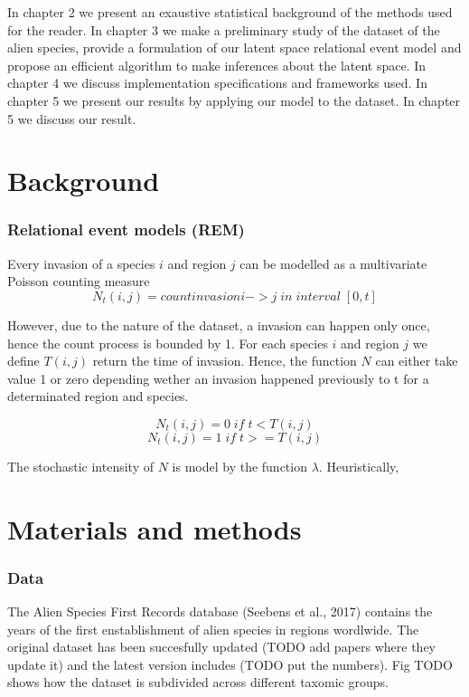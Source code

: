 \documentclass[mscthesis]{usiinfthesis}
\begin{document}
In chapter 2 we present an exaustive statistical background of the methods used for the reader. In chapter 3 we make a preliminary study of the  dataset of the alien species, provide a formulation of our latent space relational event model and propose an efficient algorithm to make inferences about the latent space. In chapter 4 we discuss implementation specifications and frameworks used. In chapter 5 we present our results by applying our model to the dataset. In chapter 5 we discuss our result.

\chapter{Background}
\subsection{Relational event models (REM)}


Every invasion of a species $i$ and region $j$ can be modelled as a multivariate Poisson counting measure $$N_t(i, j) = count{invasion i -> j \; in \; interval \; [0, t]}$$

However, due to the nature of the dataset, a invasion can happen only once, hence the count process is bounded by 1. For each species $i$ and region $j$ we define $T(i, j)$ return the time of invasion. Hence, the function $N$ can either take value 1 or zero depending wether an invasion happened previously to t for a determinated region and species.

\[
N_t(i, j) = 0 \; if \; t < T(i, j)
\]
\[
N_t(i, j) = 1 \; if \; t >= T(i, j)
\]

The stochastic intensity of $N$ is model by the function $\lambda$. Heuristically, 

\chapter{Materials and methods}

\subsection{Data}

The Alien Species First Records database (Seebens et al., 2017) contains the years of the first enstablishment of alien species in regions wordlwide. The original dataset has been succesfully updated (TODO add papers where they update it) and the latest version includes (TODO put the numbers). Fig TODO shows how the dataset is subdivided across different taxomic groups. 
\end{document}
